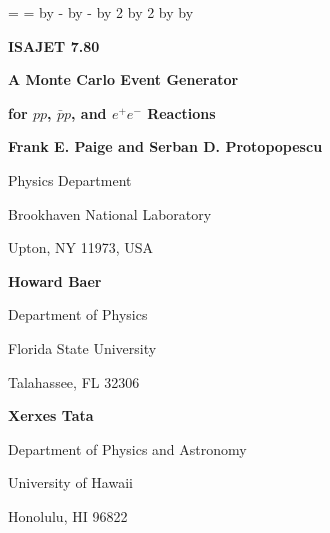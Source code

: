 
\newdimen\SaveWidth \SaveWidth=\textwidth
\newdimen\SaveHeight \SaveHeight=\textheight
\textwidth=6.5in
\textheight=8.9in
\advance\SaveWidth by -\textwidth
\advance\SaveHeight by -\textheight
\divide\SaveWidth by 2
\divide\SaveHeight by 2
\advance\hoffset by \SaveWidth
\advance\voffset by \SaveHeight

\def\sgn{\mathop{\rm sgn}}
\def\GeV{{\rm GeV}}
\def\etmiss{\slashchar{E}_T}

\def\slashchar#1{\setbox0=\hbox{$#1$}           %
   \dimen0=\wd0                                 %
   \setbox1=\hbox{/} \dimen1=\wd1               %
   \ifdim\dimen0>\dimen1                        %
      \rlap{\hbox to \dimen0{\hfil/\hfil}}      %
      #1                                        %
   \else                                        %
      \rlap{\hbox to \dimen1{\hfil$#1$\hfil}}   %
      /                                         %
   \fi}                                         %

\def\simge{%
    \mathrel{\rlap{\raise 0.511ex
        \hbox{$>$}}{\lower 0.511ex \hbox{$\sim$}}}}
\def\simle{%
    \mathrel{\rlap{\raise 0.511ex 
        \hbox{$<$}}{\lower 0.511ex \hbox{$\sim$}}}}



\centerline{\Large\bf ISAJET 7.80}
\medskip
\centerline{\Large\bf A Monte Carlo Event Generator}
\medskip
\centerline{\Large\bf for $pp$, $\bar pp$, and $e^+e^-$ Reactions}
\bigskip\bigskip
\centerline{\bf Frank E. Paige and Serban D. Protopopescu}
\smallskip
\centerline{Physics Department}
\centerline{Brookhaven National Laboratory}
\centerline{Upton, NY 11973, USA}
\bigskip
\centerline{\bf Howard Baer}
\smallskip
\centerline{Department of Physics}
\centerline{Florida State University}
\centerline{Talahassee, FL 32306}
\bigskip
\centerline{\bf Xerxes Tata}
\centerline{Department of Physics and Astronomy}
\centerline{University of Hawaii}
\centerline{Honolulu, HI 96822}

\bigskip\bigskip
\tableofcontents

\newpage
